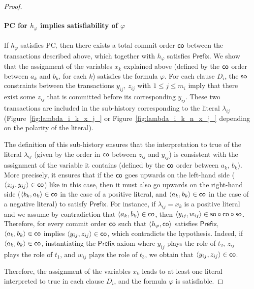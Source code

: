 \begin{proof}
\paragraph{PC for $h_\varphi$ implies satisfiability of $\varphi$}
If $h_\varphi$ satisfies PC, then there exists a total commit order $\mathsf{co}$ between the transactions described above, which together with $h_\varphi$ satisfies $\mathsf{Prefix}$. We show that the assignment of the variables $x_k$ explained above (defined by the $\mathsf{co}$ order between $a_k$ and $b_k$, for each $k$) satisfies the formula $\varphi$. For each clause $D_i$, the $\mathsf{so}$ constraints between the transactions $y_{ij}$, $z_{ij}$ with $1\leq j\leq m_i$ imply that there exist some $z_{ij}$ that is committed before its corresponding $y_{ij}$. These two transactions are included in the sub-history corresponding to the literal $\lambda_{ij}$ (Figure~\ref{fig:lambda_i_k_x_j_} or Figure~\ref{fig:lambda_i_k_n_x_j_} depending on the polarity of the literal).

The definition of this sub-history ensures that the interpretation to true of the literal $\lambda_{ij}$ (given by the order in $\mathsf{co}$ between $z_{ij}$ and $y_{ij}$) is consistent with the assignment of the variable it contains (defined by the $\mathsf{co}$ order between $a_k$, $b_k$). More precisely, it ensures that if the $\mathsf{co}$ goes upwards on the left-hand side (${\left\langle{z_{ij}, y_{ij}}\right\rangle} \in \mathsf{co}$) like in this case, then it must also go upwards on the right-hand side (${\left\langle{b_k, a_k}\right\rangle} \in \mathsf{co}$ in the case of a positive literal, and ${\left\langle{a_k, b_k}\right\rangle} \in \mathsf{co}$ in the case of a negative literal) to satisfy $\mathsf{Prefix}$. For instance, if $\lambda_{ij}=x_k$ is a positive literal and we assume by contradiction that ${\left\langle{a_k, b_k}\right\rangle} \in \mathsf{co}$, then ${\left\langle{y_{ij}, w_{ij}}\right\rangle} \in \mathsf{so} \circ \mathsf{co} \circ \mathsf{so}$. Therefore, for every commit order $\textsf{co}$ such that ${\left\langle{h_\varphi,\mathsf{co}}\right\rangle}$ satisfies $\mathsf{Prefix}$, ${\left\langle{a_k, b_k}\right\rangle} \in \textsf{co}$ implies ${\left\langle{y_{ij}, z_{ij}}\right\rangle} \in \mathsf{co}$, which contradicts the hypothesis. Indeed, if ${\left\langle{a_k, b_k}\right\rangle} \in \textsf{co}$, instantiating the $\mathsf{Prefix}$ axiom  where $y_{ij}$ plays the role of $t_2$, $z_{ij}$ plays the role of $t_1$, and $w_{ij}$ plays the role of $t_3$, we obtain that ${\left\langle{y_{ij}, z_{ij}}\right\rangle} \in \mathsf{co}$. 

Therefore, the assignment of the variables $x_k$ leads to at least one literal interpreted to true in each clause $D_i$, and the formula $\varphi$ is satisfiable.


\end{proof}
